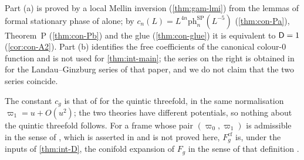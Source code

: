 Part (a) is proved by a local Mellin inversion (\cref{thm:gam-lmi}) from the lemmas of formal stationary phase of  alone; by $c_n(L)=L^{4n}\mathrm{ph}^{\mathrm{SP}}_n(L^{-5})$ (\cref{thm:con-Pa}), Theorem~P (\cref{thm:con-Pb}) and the glue (\cref{thm:con-glue}) it is equivalent to $\mathsf{D}=1$ (\cref{cor:con-A2}). Part (b) identifies the free coefficients of the canonical colour-$0$ function  and is not used for \cref{thm:int-main}; the series on the right is obtained in \cite{GJR18} for the Landau--Ginzburg series of that paper, and we do not claim that the two series coincide.

\begin{rmk}
\label{rmk:int-constant}
The constant $c_g$ is that of \cite[Conjecture~1.5]{CGYZ26} for the quintic threefold, in the same normalisation $\varpi_1=u+O(u^2)$; the two theories have different potentials, so nothing about the quintic threefold follows. For a frame whose pair $(\varpi_0,\varpi_1)$ is admissible in the sense of \cite[Def.~1.2]{CGYZ26}, which is asserted in \cite[Ex.~1.3, Rem.~1.4]{CGYZ26} and is not proved here, $F_g^{\mathrm{cf}}$ is, under the inputs of \cref{thm:int-D}, the conifold expansion of $F_g$ in the sense of that definition .
\end{rmk}


